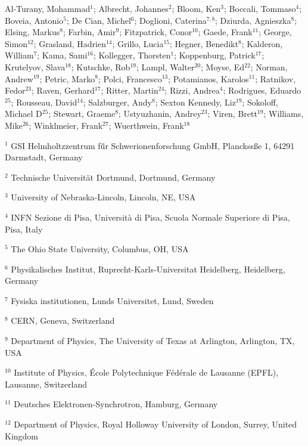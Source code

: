 Al-Turany, Mohammad$^{1}$;
Albrecht, Johannes$^{2}$;
Bloom, Ken$^{3}$;
Boccali, Tommaso$^{4}$;
Boveia, Antonio$^{5}$;
De Cian, Michel$^{6}$;
Doglioni, Caterina$^{7,b}$;
Dziurda, Agnieszka$^{8}$;
Elsing, Markus$^{8}$;
Farbin, Amir$^{9}$;
Fitzpatrick, Conor$^{10}$;
Gaede, Frank$^{11}$;
George, Simon$^{12}$;
Grasland, Hadrien$^{14}$;
Grillo, Lucia$^{15}$;
Hegner, Benedikt$^{8}$;
Kalderon, William$^{7}$;
Kama, Sami$^{16}$;
Kollegger, Thorsten$^{1}$;
Koppenburg, Patrick$^{17}$;
Krutelyov, Slava$^{18}$;
Kutschke, Rob$^{19}$;
Lampl, Walter$^{20}$;
Moyse, Ed$^{22}$;
Norman, Andrew$^{19}$;
Petric, Marko$^{8}$;
Polci, Francesco$^{13}$;
Potamianos, Karolos$^{11}$;
Ratnikov, Fedor$^{23}$;
Raven, Gerhard$^{17}$;
Ritter, Martin$^{24}$;
Rizzi, Andrea$^{4}$;
Rodrigues, Eduardo$^{25}$;
Rousseau, David$^{14}$;
Salzburger, Andy$^{8}$;
Sexton Kennedy, Liz$^{19}$;
Sokoloff, Michael D$^{25}$;
Stewart, Graeme$^{8}$;
Ustyuzhanin, Andrey$^{23}$;
Viren, Brett$^{19}$;
Williams, Mike$^{26}$;
Winklmeier, Frank$^{27}$;
Wuerthwein, Frank$^{18}$
\bigskip 
\par {\footnotesize $^{1}$ GSI Helmholtzzentrum f\"ür Schwerionenforschung GmbH, Planckssße 1, 64291 Darmstadt, Germany}
\par {\footnotesize $^{2}$ Technische Universit\"at Dortmund, Dortmund, Germany}
\par {\footnotesize $^{3}$ University of Nebraska-Lincoln, Lincoln, NE, USA}
\par {\footnotesize $^{4}$ INFN Sezione di Pisa, Università di Pisa, Scuola Normale Superiore di Pisa, Pisa, Italy}
\par {\footnotesize $^{5}$ The Ohio State University, Columbus, OH, USA}
\par {\footnotesize $^{6}$ Physikalisches Institut, Ruprecht-Karls-Universitat Heidelberg, Heidelberg, Germany}
\par {\footnotesize $^{7}$ Fysiska institutionen, Lunds Universitet, Lund, Sweden}
\par {\footnotesize $^{8}$ CERN, Geneva, Switzerland}
\par {\footnotesize $^{9}$ Department of Physics, The University of Texas at Arlington, Arlington, TX, USA}
\par {\footnotesize $^{10}$ Institute of Physics, École Polytechnique Fédérale de Lausanne (EPFL), Lausanne, Switzerland}
\par {\footnotesize $^{11}$ Deutsches Elektronen-Synchrotron, Hamburg, Germany}
\par {\footnotesize $^{12}$ Department of Physics, Royal Holloway University of London, Surrey, United Kingdom}
